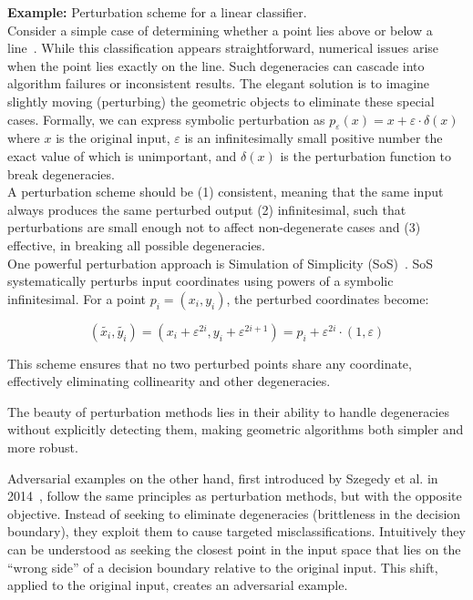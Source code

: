 \documentclass[a4paper, oneside]{discothesis}
\begin{document}
\begin{highlightbox}
	\textbf{Example:} Perturbation scheme for a linear classifier. \\

	Consider a simple case of determining whether a point lies above or below a line~\cite{de2000computational}. While this classification appears straightforward, numerical issues arise when the point lies exactly on the line. Such degeneracies can cascade into algorithm failures or inconsistent results. The elegant solution is to imagine slightly moving (perturbing) the geometric objects to eliminate these special cases. Formally, we can express symbolic perturbation as $p_\varepsilon(x) = x + \varepsilon \cdot \delta(x)$ where $x$ is the original input, $\varepsilon$ is an infinitesimally small positive number the exact value of which is unimportant, and $\delta(x)$ is the perturbation function to break degeneracies. \\

	A perturbation scheme should be (1) consistent, meaning that the same input always produces the same perturbed output (2) infinitesimal, such that perturbations are small enough not to affect non-degenerate cases and (3) effective, in breaking all possible degeneracies. \\

	One powerful perturbation approach is Simulation of Simplicity (SoS)~\cite{franklin2022implementing, edelsbrunner2002topological, edelsbrunner2001sink, edelsbrunner1990simulation, levy2016robustness, schorn1993axiomatic}. SoS systematically perturbs input coordinates using powers of a symbolic infinitesimal. For a point $p_i = (x_i, y_i)$, the perturbed coordinates become:

	$$(\tilde{x_i}, \tilde{y_i}) = (x_i + \varepsilon^{2i}, y_i + \varepsilon^{2i+1}) = p_i + \varepsilon^{2i} \cdot (1, \varepsilon)$$

	This scheme ensures that no two perturbed points share any coordinate, effectively eliminating collinearity and other degeneracies.
\end{highlightbox}

The beauty of perturbation methods lies in their ability to handle degeneracies without explicitly detecting them, making geometric algorithms both simpler and more robust.

Adversarial examples on the other hand, first introduced by Szegedy et al. in 2014~\cite{szegedy2013intriguing}, follow the same principles as perturbation methods, but with the opposite objective. Instead of seeking to eliminate degeneracies (brittleness in the decision boundary), they exploit them to cause targeted misclassifications. Intuitively they can be understood as seeking the closest point in the input space that lies on the ``wrong side'' of a decision boundary relative to the original input. This shift, applied to the original input, creates an adversarial example.
\end{document}
